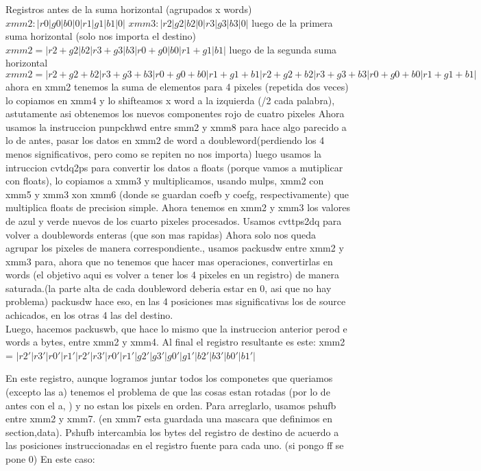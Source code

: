 \documentclass[a4paper]{article}
\begin{document}
   Registros antes de la suma horizontal (agrupados x words)
   \hfill \break
  $ xmm2 :| r0 | g0 | b0 | 0 | r1 | g1 | b1 | 0 | $
  $ xmm3 :| r2 | g2 | b2 | 0 | r3 | g3 | b3 | 0 |$
   \hfill \break
   luego de la primera suma horizontal (solo nos importa el destino)
   \hfill \break
   $xmm2 = | r2+g2 | b2 | r3+g3 | b3 | r0+g0 | b0 | r1+g1 | b1 |$
   \hfill \break
   luego de la segunda suma horizontal 
   \hfill \break
   $xmm2 = | r2+g2+b2 | r3+g3+b3 | r0+g0+b0 | r1+g1+b1 | r2+g2+b2 | r3+g3+b3 | r0+g0+b0 | r1+g1+b1 |$
   \hfill \break
   \\
   ahora en xmm2 tenemos la suma de elementos para 4 pixeles (repetida dos veces) lo copiamos en xmm4 y lo shifteamos x word a la izquierda (/2 cada palabra), astutamente asi obtenemos los nuevos componentes rojo de cuatro pixeles\hfill \break
   Ahora usamos la instruccion punpckhwd entre smm2 y xmm8 para hace algo parecido a lo de antes,  pasar los datos en xmm2 de word a doubleword(perdiendo los 4 menos significativos, pero como se repiten no nos importa) luego usamos la intruccion cvtdq2ps para convertir los datos a floats (porque vamos a mutiplicar con floats), lo copiamos a xmm3 y multiplicamos, usando mulps, xmm2 con xmm5 y xmm3 xon xmm6 (donde se guardan coefb y coefg, respectivamente) que multiplica floats de precision simple. Ahora tenemos en xmm2 y xmm3 los valores de azul y verde nuevos de los cuarto pixeles procesados. Usamos cvttps2dq para volver a doublewords enteras (que son mas rapidas)\hfill \break
   Ahora solo nos queda agrupar los pixeles de  manera correspondiente., usamos packusdw entre xmm2 y xmm3 para, ahora que no tenemos que hacer mas operaciones, convertirlas en words (el objetivo aqui es volver a tener los 4 pixeles en un registro) de manera saturada.(la parte alta de cada doubleword deberia estar en 0, asi que no hay problema) packusdw hace eso, en las 4 posiciones mas significativas los de source achicados, en los otras 4  las del destino.\hfill \break
   \\
   Luego, hacemos packuswb, que hace lo mismo que la instruccion anterior perod e words a bytes, entre xmm2 y xmm4. Al final el registro resultante es este:
   \hfill \break
    xmm2 = $ | r2' | r3' | r0' | r1' | r2' | r3' | r0' | r1' | g2' | g3' | g0' | g1' | b2' | b3' | b0' | b1' | $
    
    \hfill \break
    En este registro, aunque logramos juntar todos los componetes que queriamos (excepto las a) tenemos el problema de que las cosas estan rotadas (por lo de antes con el a, ) y no estan los pixels en orden.
    \hfill \break
    	Para arreglarlo, usamos pshufb entre xmm2 y xmm7. (en xmm7 esta guardada una mascara que definimos en section,data). Pshufb intercambia los bytes del registro de destino de acuerdo a las posiciones instruccionadas en el registro fuente para cada uno. (si pongo ff se pone 0)
    	\hfill \break
    	En este caso:
    	\hfill \break
    	
\end{document}
